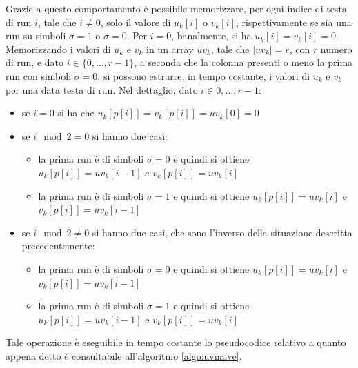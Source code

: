 Grazie a questo comportamento è possibile memorizzare, per ogni indice di
testa di run $i$, tale che $i\neq 0$, solo il valore di $u_k[i]$ o $v_k[i]$,
rispettivamente se sia una run su simboli $\sigma=1$ o $\sigma=0$.
Per $i=0$, banalmente, si ha $u_k[i]=v_k[i]=0$.\\
Memorizzando i valori di $u_k$ e $v_k$ in un array $uv_k$, tale che $|uv_k|=r$,
con $r$ numero di run, e dato $i\in\{0,\ldots, r-1\}$, a seconda che la colonna
presenti o meno la prima run  
con simboli $\sigma=0$, si possono estrarre, in tempo costante, i valori di
$u_k$ e $v_k$ per una data testa di run. Nel dettaglio, dato $i\in{0,\ldots,
  r-1}$:
\begin{itemize}
  \item se $i=0$ si ha che $u_k[p[i]]=v_k[p[i]]=uv_k[0]=0$
  \item se $i\mod 2 =0$ si hanno due casi:
  \begin{itemize}
    \item la prima run è di simboli $\sigma=0$ e quindi si ottiene
    $u_k[p[i]]=uv_k[i-1]$ e $v_k[p[i]]=uv_k[i]$
    \item la prima run è di simboli $\sigma=1$ e quindi si ottiene
    $u_k[p[i]]=uv_k[i]$ e $v_k[p[i]]=uv_k[i-1]$
  \end{itemize}
  \item se $i\mod 2 \neq 0$ si hanno due casi, che sono l'inverso della
  situazione descritta precedentemente:
  \begin{itemize}
    \item la prima run è di simboli $\sigma=0$ e quindi si ottiene
    $u_k[p[i]]=uv_k[i]$ e $v_k[p[i]]=uv_k[i-1]$
    \item la prima run è di simboli $\sigma=1$ e quindi si ottiene
    $u_k[p[i]]=uv_k[i-1]$ e $v_k[p[i]]=uv_k[i]$   
  \end{itemize}
\end{itemize}
Tale operazione è eseguibile in tempo costante lo pseudocodice relativo a
quanto appena detto è consultabile all'algoritmo \ref{algo:uvnaive}.
